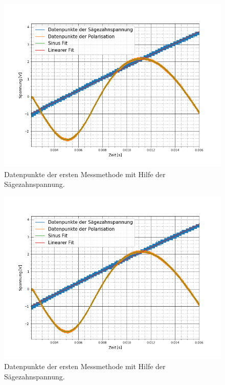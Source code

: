 \begin{figure}[ht]
	\includegraphics[scale=0.5]{Bild/V1_3}
	\centering
	\caption[Plot zu Versuchsteil 1 Nr.3]{Datenpunkte der ersten Messmethode mit Hilfe der Sägezahnspannung.}
\end{figure}
\begin{figure}[ht]
	\includegraphics[scale=0.5]{Bild/V1_4}
	\centering
	\caption[Plot zu Versuchsteil 1 Nr.4]{Datenpunkte der ersten Messmethode mit Hilfe der Sägezahnspannung.}
\end{figure}
